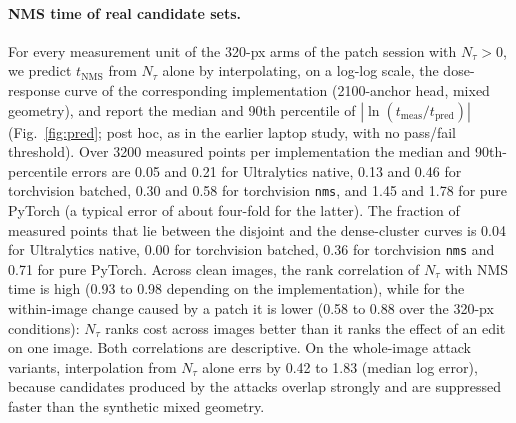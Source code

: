 \documentclass[a4paper,fleqn]{cas-dc}
\newcommand{\Ntau}{N_{\tau}}
\begin{document}
\paragraph{NMS time of real candidate sets.}
For every measurement unit of the 320-px arms of the patch session with $\Ntau>0$, we predict $t_{\mathrm{NMS}}$ from $\Ntau$ alone by interpolating, on a log-log scale, the dose-response curve of the corresponding implementation (2100-anchor head, mixed geometry), and report the median and 90th percentile of $|\ln(t_{\mathrm{meas}}/t_{\mathrm{pred}})|$ (Fig.~\ref{fig:pred}; post hoc, as in the earlier laptop study, with no pass/fail threshold). Over 3200 measured points per implementation the median and 90th-percentile errors are 0.05 and 0.21 for Ultralytics native, 0.13 and 0.46 for torchvision batched, 0.30 and 0.58 for torchvision \texttt{nms}, and 1.45 and 1.78 for pure PyTorch (a typical error of about four-fold for the latter). The fraction of measured points that lie between the disjoint and the dense-cluster curves is 0.04 for Ultralytics native, 0.00 for torchvision batched, 0.36 for torchvision \texttt{nms} and 0.71 for pure PyTorch. Across clean images, the rank correlation of $\Ntau$ with NMS time is high (0.93 to 0.98 depending on the implementation), while for the within-image change caused by a patch it is lower (0.58 to 0.88 over the 320-px conditions): $\Ntau$ ranks cost across images better than it ranks the effect of an edit on one image. Both correlations are descriptive. On the whole-image attack variants, interpolation from $\Ntau$ alone errs by 0.42 to 1.83 (median log error), because candidates produced by the attacks overlap strongly and are suppressed faster than the synthetic mixed geometry.


\end{document}
